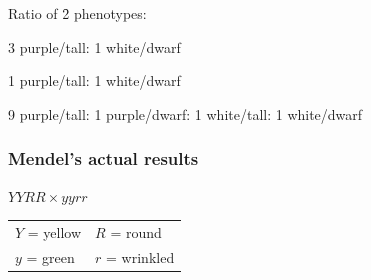 \begin{noheadline}
\begin{frame}[t]
    Ratio of \f{2} phenotypes:
    \begin{clickeroptions}
        \item 3 purple/tall: 1 white/dwarf
        \item 1 purple/tall: 1 white/dwarf
        \item 9 purple/tall: 1 purple/dwarf: 1 white/tall: 1 white/dwarf
        \item {}
    \end{clickeroptions}
\end{frame}
\end{noheadline}

\begin{frame}[t]
    \frametitle{Mendel's actual results}
    \vspace{-6mm}
    \begin{center}
        $YYRR  \times yyrr$
    \end{center}
    \vspace{-4mm}
    \begin{table}%
        \centering
        \begin{tabular}{l l}
            $Y$ = yellow & $R$ = round \\
            $y$ = green & $r$ = wrinkled \\
        \end{tabular}
    \end{table}

    \vspace{-2mm}

    \vspace{2mm}


\end{frame}
